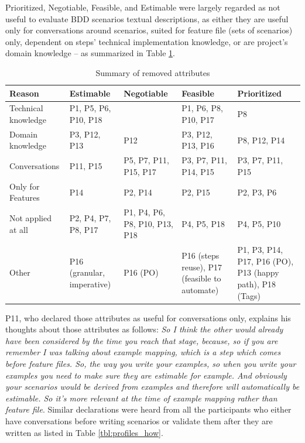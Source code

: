 Prioritized, Negotiable, Feasible, and Estimable were largely regarded as not useful to evaluate BDD scenarios textual descriptions, as either they are useful only for conversations around scenarios, suited for feature file (sets of scenarios) only, dependent on steps' technical implementation knowledge, or are project's domain knowledge -- as summarized in Table \ref{tbl:attributes_removed}.

\begin{table}[t]
	\caption{Summary of removed attributes}
	\label{tbl:attributes_removed}
	\centering
	\begin{tabular}{|m{4cm}|m{2.5cm}|m{2.5cm}|m{2.5cm}|m{2.5cm}|}
		\hline
		\textbf{Reason} & \textbf{Estimable} & \textbf{Negotiable} & \textbf{Feasible} & \textbf{Prioritized}\\
		\hline
		Technical knowledge & P1, P5, P6, P10, P18 &  & P1, P6, P8, P10, P17 & P8\\
		\hline
		Domain knowledge & P3, P12, P13 & P12 & P3, P12, P13, P16 & P8, P12, P14\\
		\hline
		Conversations & P11, P15 & P5, P7, P11, P15, P17 & P3, P7, P11, P14, P15 & P3, P7, P11, P15\\
		\hline
		Only for Features & P14 & P2, P14 & P2, P15 & P2, P3, P6\\
		\hline
		Not applied at all & P2, P4, P7, P8, P17 & P1, P4, P6, P8, P10, P13, P18 & P4, P5, P18 & P4, P5, P10\\
		\hline
		Other & P16 (granular, imperative) & P16 (PO) & P16 (steps reuse), P17 (feasible to automate) & P1, P3, P14, P17, P16 (PO), P13 (happy path), P18 (Tags)\\
		\hline
	\end{tabular}
\end{table}

P11, who declared those attributes as useful for conversations only, explains his thoughts about those attributes as follows: \textit{So I think the other would already have been considered by the time you reach that stage, because, so if you are remember I was talking about example mapping, which is a step which comes before feature files. So, the way you write your examples, so when you write your examples you need to make sure they are estimable for example. And obviously your scenarios would be derived from examples and therefore will automatically be estimable. So it's more relevant at the time of example mapping rather than feature file}. Similar declarations were heard from all the participants who either have conversations before writing scenarios or validate them after they are written as listed in Table \ref{tbl:profiles_how}.

